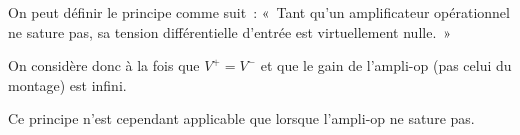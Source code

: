 \documentclass{../template/tp}
\begin{document}
{
	On peut définir le principe comme suit~: «~Tant qu'un amplificateur opérationnel ne sature pas, sa tension différentielle  d'entrée est virtuellement nulle.~»

	On considère donc à la fois que $V^+ = V^-$ et que le gain de l'ampli-op (pas celui du montage) est infini.

	Ce principe n'est cependant applicable que lorsque l'ampli-op ne sature pas.
}

\end{document}
